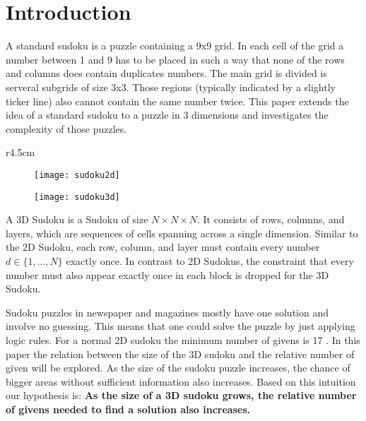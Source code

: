 \section{Introduction}
A standard sudoku is a puzzle containing a 9x9 grid. In each cell of the grid a number between 1 and 9 has to be placed in such a way that none of the rows and columns does contain duplicates numbers.
The main grid is divided is serveral subgrids of size 3x3. Those regions (typically indicated by a slightly ticker line) also cannot contain the same number twice. This paper extends the idea of a standard sudoku to a puzzle in 3 dimensions and investigates the complexity of those puzzles.

\begin{wrapfigure}{r}{4.5cm}

\begin{subfigure}[b]{0.55\textwidth}
   \texttt{[image: sudoku2d]}

   \label{fig:Ng1} 
\end{subfigure}

\begin{subfigure}[b]{0.55\textwidth}
\vspace{.2cm}
   \texttt{[image: sudoku3d]}

   \label{fig:Ng2}
\end{subfigure}

\end{wrapfigure} 

A 3D Sudoku is a Sudoku of size $N \times N \times N$. It consists of rows, columns, and layers, which are sequences of cells spanning across a single dimension. Similar to the 2D Sudoku, each row, column, and layer must contain every number $d \in \{1, \hdots, N\}$ exactly once. In contrast to 2D Sudokus, the constraint that every number must also appear exactly once in each block is dropped for the 3D Sudoku. 

Sudoku puzzles in newspaper and magazines mostly have one solution and involve no guessing. This means that one could solve the puzzle by just applying logic rules. For a normal 2D sudoku the minimum number of givens is 17 \cite{sud16}. In this paper the relation between the size of the 3D sudoku and the relative number of given will be explored. As the size of the sudoku puzzle increases, the chance of bigger areas without sufficient information also increases. Based on this intuition our hypothesis is:  \textbf{As the size of a 3D sudoku grows, the relative number of givens needed to find a solution also increases.}